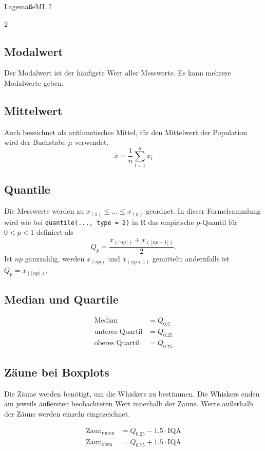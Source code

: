\begin{formulaBox}{Lagemaße}{ML I}

\begin{multicols}{2}

\subsection*{Modalwert}

Der Modalwert ist der häufigste Wert aller Messwerte. Es kann mehrere Modalwerte geben.


\subsection*{Mittelwert}
Auch bezeichnet als arithmetisches Mittel, für den Mittelwert der Population wird der Buchstabe $\mu$ verwendet.
\begin{equation*}
\bar{x}=\frac{1}{n}\sum_{i=1}^n x_i
\end{equation*}

\subsection*{Quantile}

Die Messwerte werden zu $x_{(1)}\leq\dots\leq x_{(n)}$ geordnet. In dieser Formelsammlung wird wie bei \texttt{quantile(..., type = 2)} in R das empirische $p$-Quantil für $0<p<1$ definiert als
\begin{equation*}
Q_p=\frac{x_{(\lceil np\rceil)}+x_{(\lfloor np+1\rfloor)}}{2}.
\end{equation*}
Ist $np$ ganzzahlig, werden $x_{(np)}$ und $x_{(np+1)}$ gemittelt; andernfalls ist $Q_p=x_{(\lceil np\rceil)}$.

\subsection*{Median und Quartile}

\begin{align*}
\text{Median}&=Q_{0.5}\\
\text{unteres Quartil}&=Q_{0.25}\\
\text{oberes Quartil}&=Q_{0.75}
\end{align*}

\subsection*{Zäune bei Boxplots}
Die Zäune werden benötigt, um die Whiskers zu bestimmen. Die Whiskers enden am jeweils äußersten beobachteten Wert innerhalb der Zäune. Werte außerhalb der Zäune werden einzeln eingezeichnet.

\begin{align*}
  \text{Zaun}_{\text{unten}}&= Q_{0.25}-1.5 \cdot \mathrm{IQA}\\
  \text{Zaun}_{\text{oben}} &= Q_{0.75}+1.5 \cdot \mathrm{IQA}
\end{align*}


\end{multicols}
\end{formulaBox}
